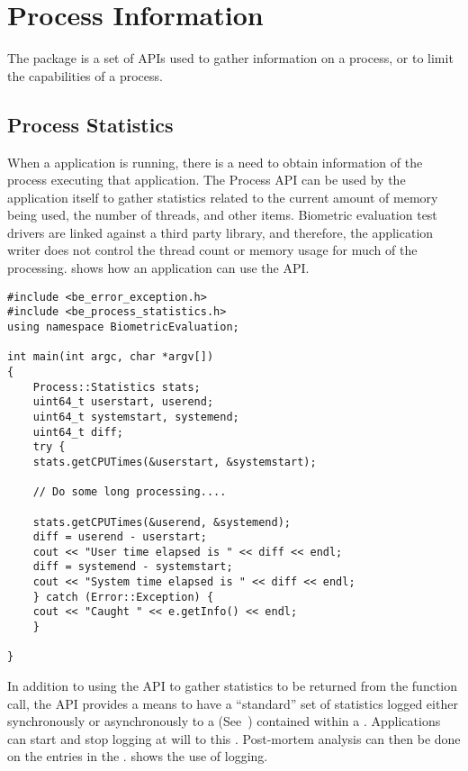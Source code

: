 %
%
\chapter{Process Information}
\label{chp-process}

The  package is a set of APIs used to gather information on a process,
or to limit the capabilities of a process.

\section{Process Statistics}
\label{sec-process_statistics}

When a application is running, there is a need to obtain information of the
process executing that application. The Process API can be used by the
application itself to gather statistics related to the current amount of memory
being used, the number of threads, and other items. Biometric evaluation test
drivers are linked against a third party library, and therefore, the application
writer does not control the thread count or memory usage for much of the
processing.  shows how an application can
use the  API.

\begin{lstlisting}[caption={Gathering Process Statistics}, label=processstatisticsuse]
#include <be_error_exception.h>
#include <be_process_statistics.h>
using namespace BiometricEvaluation;

int main(int argc, char *argv[])
{
    Process::Statistics stats;
    uint64_t userstart, userend;
    uint64_t systemstart, systemend;
    uint64_t diff;
    try {
	stats.getCPUTimes(&userstart, &systemstart);

	// Do some long processing....

	stats.getCPUTimes(&userend, &systemend);
	diff = userend - userstart;
	cout << "User time elapsed is " << diff << endl;
	diff = systemend - systemstart;
	cout << "System time elapsed is " << diff << endl;
    } catch (Error::Exception) {
	cout << "Caught " << e.getInfo() << endl;
    }

}
\end{lstlisting}

In addition to using the  API to gather statistics to be returned from
the function call, the API provides a means to have a ``standard'' set of
statistics logged either synchronously or asynchronously to a 
 (See~) contained within a .
Applications can
start and stop logging at will to this . Post-mortem analysis can
then be done on the entries in the . 
shows the use of logging.

